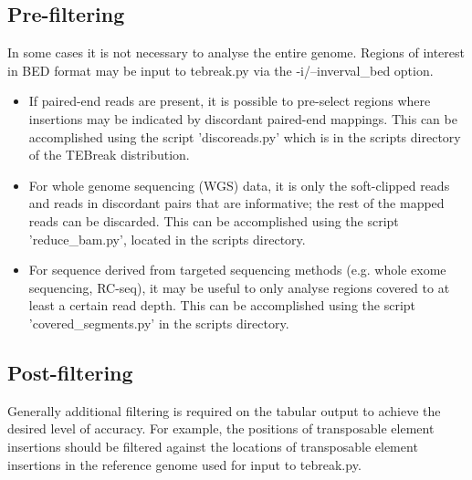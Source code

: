 \documentclass[letterpaper,11pt]{article}
\begin{document}
\subsection{Pre-filtering}
In some cases it is not necessary to analyse the entire genome. Regions of interest in BED format may be input to tebreak.py via the -i/--inverval\_bed option.

\begin{itemize}
\item If paired-end reads are present, it is possible to pre-select regions where insertions may be indicated by discordant paired-end mappings. This can be accomplished using the script 'discoreads.py' which is in the scripts directory of the TEBreak distribution. 
\item For whole genome sequencing (WGS) data, it is only the soft-clipped reads and reads in discordant pairs that are informative; the rest of the mapped reads can be discarded. This can be accomplished using the script 'reduce\_bam.py', located in the scripts directory.
\item For sequence derived from targeted sequencing methods (e.g. whole exome sequencing, RC-seq), it may be useful to only analyse regions covered to at least a certain read depth. This can be accomplished using the script 'covered\_segments.py' in the scripts directory.
\end{itemize}

\subsection{Post-filtering}
Generally additional filtering is required on the tabular output to achieve the desired level of accuracy. For example, the positions of transposable element insertions should be filtered against the locations of transposable element insertions in the reference genome used for input to tebreak.py.
\end{document}
